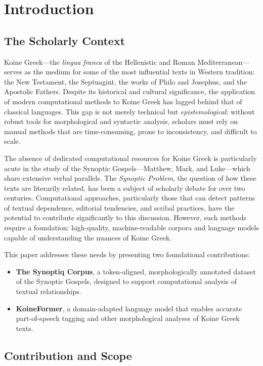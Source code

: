 \documentclass[11pt,letterpaper]{article}
\begin{document}
\section{Introduction}
\subsection{The Scholarly Context}

Koine Greek—the \textit{lingua franca} of the Hellenistic and Roman Mediterranean—serves as the medium for some of the most influential texts in Western tradition: the New Testament, the Septuagint, the works of Philo and Josephus, and the Apostolic Fathers. Despite its historical and cultural significance, the application of modern computational methods to Koine Greek has lagged behind that of classical languages. This gap is not merely technical but \textit{epistemological}: without robust tools for morphological and syntactic analysis, scholars must rely on manual methods that are time-consuming, prone to inconsistency, and difficult to scale.

The absence of dedicated computational resources for Koine Greek is particularly acute in the study of the Synoptic Gospels—Matthew, Mark, and Luke—which share extensive verbal parallels. The \textit{Synoptic Problem}, the question of how these texts are literarily related, has been a subject of scholarly debate for over two centuries. Computational approaches, particularly those that can detect patterns of textual dependence, editorial tendencies, and scribal practices, have the potential to contribute significantly to this discussion. However, such methods require a foundation: high-quality, machine-readable corpora and language models capable of understanding the nuances of Koine Greek.

This paper addresses these needs by presenting two foundational contributions:
\begin{itemize}
    \item \textbf{The Synoptiq Corpus}, a token-aligned, morphologically annotated dataset of the Synoptic Gospels, designed to support computational analysis of textual relationships.
    \item \textbf{KoineFormer}, a domain-adapted language model that enables accurate part-of-speech tagging and other morphological analyses of Koine Greek texts.
\end{itemize}

\subsection{Contribution and Scope}
\end{document}
